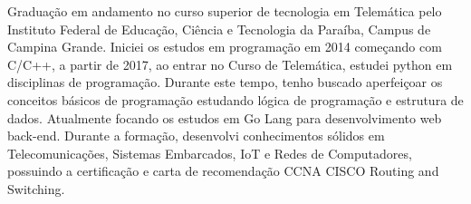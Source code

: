 \begin{cvletter}
  Graduação em andamento no curso superior de tecnologia em Telemática pelo Instituto Federal de Educação, Ciência e Tecnologia da Paraíba, Campus de Campina Grande. Iniciei os estudos em programação em 2014 começando com C/C++, a partir de 2017, ao entrar no Curso de Telemática, estudei python em disciplinas de programação. Durante este tempo, tenho buscado aperfeiçoar os conceitos básicos de programação estudando lógica de programação e estrutura de dados. Atualmente focando os estudos em Go Lang para desenvolvimento web back-end. Durante a formação, desenvolvi conhecimentos sólidos em Telecomunicações, Sistemas Embarcados, IoT e Redes de Computadores, possuindo a certificação e carta de recomendação CCNA CISCO Routing and Switching.

\end{cvletter}